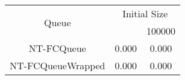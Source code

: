 \begin{tabular}{|c|c|c|}
\hline
\multirow{2}{*}{Queue} & \multicolumn{2}{c|}{Initial Size}\\\cline{2-3}& \qquad 10000 \qquad\quad & 100000\\
\hline
\hline
NT-FCQueue & 0.000 & 0.000\\
NT-FCQueueWrapped & 0.000 & 0.000\\
\hline\end{tabular}
